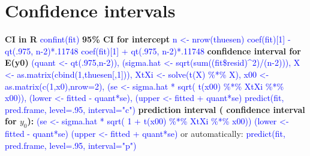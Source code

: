 \section{Confidence intervals}
\textbf{CI in R} \textcolor{blue}{confint(fit)}
\textbf{95\% CI for intercept} \textcolor{blue}{n <- nrow(thuesen)
coef(fit)[1] - qt(.975, n-2)*.11748
coef(fit)[1] + qt(.975, n-2)*.11748}
\textbf{confidence interval for E(y0)}
\textcolor{blue}{(quant <- qt(.975,n-2)), (sigma.hat <- sqrt(sum((fit\$resid)\^{}2)/(n-2))), X <- as.matrix(cbind(1,thuesen[,1])), XtXi <- solve(t(X) \%*\% X), x00 <- as.matrix(c(1,x0),nrow=2), (se <- sigma.hat * sqrt( t(x00) \%*\% XtXi \%*\% x00)), (lower <- fitted - quant*se), (upper <- fitted + quant*se)}
\textcolor{blue}{predict(fit, pred.frame, level=.95, interval="c")}
\textbf{prediction interval ( confidence interval for $y_0$): }
\textcolor{blue}{(se <- sigma.hat * sqrt( 1 + t(x00) \%*\% XtXi \%*\% x00))
(lower <- fitted - quant*se)
(upper <- fitted + quant*se)} or automatically: \textcolor{blue}{predict(fit, pred.frame, level=.95, interval="p")}